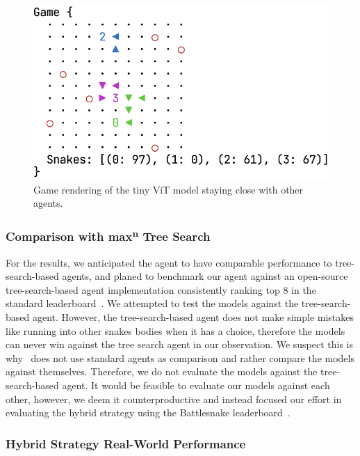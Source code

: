 \documentclass[conference]{IEEEtran}
\begin{document}
\begin{figure}
    \centering
    \includegraphics[width=\linewidth]{tiny_vit_close_render.png}
    \caption{Game rendering of the tiny ViT model staying close with other
        agents.
    }
    \label{fig:tiny-vit-close-render}
\end{figure}

\subsubsection{Comparison with max\textsuperscript{n} Tree Search}

For the results,
we anticipated the agent to have comparable performance to tree-search-based
agents,
and planed to benchmark our agent against an open-source tree-search-based agent
implementation consistently ranking top 8 in the standard
leaderboard~\cite{wrenger2024rusty}.
We attempted to test the models against the tree-search-based agent. However,
the tree-search-based agent does not make simple mistakes like running into
other snakes bodies when it has a choice,
therefore the models can never win against the tree search agent in our
observation. We suspect this is why~\cite{chung2020battlesnake}
does not use standard agents as comparison and rather compare the models against
themselves. Therefore,
we do not evaluate the models against the tree-search-based agent.
It would be feasible to evaluate our models against each other, however,
we deem it counterproductive and instead focused our effort in evaluating the
hybrid strategy using the Battlesnake leaderboard~\cite{standard_leaderboard}.

\subsubsection{Hybrid Strategy Real-World Performance}\label{sec:real-world}
\end{document}
